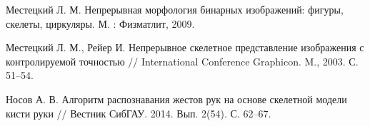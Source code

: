 \begin{thebibliography}{99}
Местецкий Л. М. Непрерывная морфология бинарных изображений: фигуры,
скелеты, циркуляры. М. : Физматлит, 2009.

Местецкий Л. М., Рейер И. Непрерывное скелетное представление 
изображения с контролируемой точностью // International Conference
Graphicon. M., 2003. С. 51–54.

Носов А. В. Алгоритм распознавания жестов
рук на основе скелетной модели кисти руки // Вестник
СибГАУ. 2014. Вып. 2(54). С. 62–67.

\end{thebibliography}

